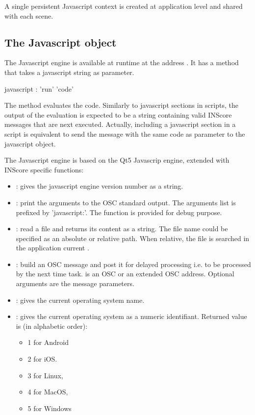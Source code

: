 \documentclass[a4paper,twoside]{report}
\newcommand{\subsublevel}[1]	{\subsection{#1}}
\begin{document}
\example
{}

A single persistent Javascript context is created at application level and shared with each scene.

\subsublevel{The Javascript object}
\label{jsobj}

The Javascript engine is available at runtime at the address . It has a  method that takes a javascript string as parameter.

\begin{rail} 
javascript :  'run' 'code'
\end{rail}

The  method evaluates the code. Similarly to javascript sections in scripts, the output of the evaluation is expected to be a string containing valid INScore messages that are next executed. 
Actually, including a javascript section in a script is equivalent to send the  message with the same code as parameter to the javascript object.

The Javascript engine is based on the Qt5 Javascrip engine, extended with INScore specific functions:
\begin{itemize}
\item \textbf{}: gives the javascript engine version number as a string.
\item \textbf{}: print the arguments to the OSC standard output. The arguments list is prefixed by 'javascript:'. The function is provided for debug purpose.
\item \textbf{}: read a file and returns its content as a string. The file name could be specified as an absolute or relative path. When relative, the file is searched in the application current .
\item \textbf{}: build an OSC message and post it for delayed processing i.e. to be processed by the next time task.  is an OSC or an extended OSC address. Optional arguments are the message parameters.
\item \textbf{}: gives the current operating system name.
\item \textbf{}: gives the current operating system as a numeric identifiant. Returned value is (in alphabetic order): 
\begin{itemize}
\item 1 for Android
\item 2 for iOS.
\item 3 for Linux, 
\item 4 for MacOS, 
\item 5 for Windows
\end{itemize}
\end{itemize}
\end{document}
